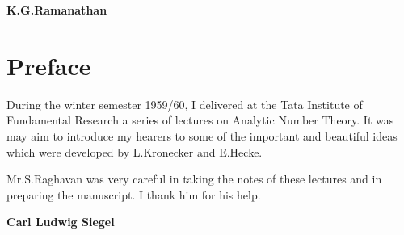 \hfill {\large\bf K.\@ G.\@ Ramanathan}
\vfill
\eject



\chapter{Preface}


During the winter semester 1959/60, I delivered at the Tata Institute
of Fundamental Research a series of lectures on Analytic Number
Theory. It was may aim to introduce my hearers to some of the
important and beautiful ideas which were developed by L.\@ Kronecker
and E.\@ Hecke.

Mr.\@ S.\@ Raghavan was very careful in taking the notes of these
lectures and in preparing the manuscript. I thank him for his help.
\vskip 1cm

\hfill {\large\bfseries Carl Ludwig Siegel}
